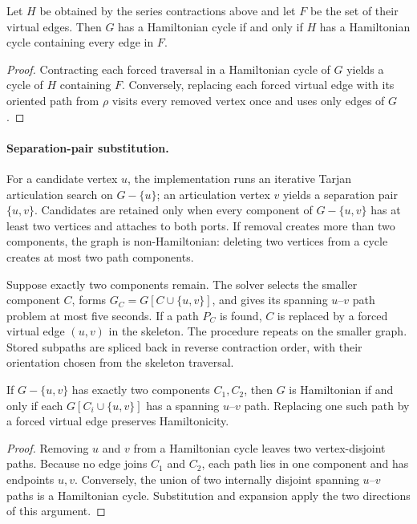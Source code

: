 \documentclass[sigconf,anonymous]{aamas}
\begin{document}
\begin{proposition}
\label{prop:series}
Let $H$ be obtained by the series contractions above and let $F$ be the
set of their virtual edges. Then $G$ has a Hamiltonian cycle if and only
if $H$ has a Hamiltonian cycle containing every edge in $F$.
\end{proposition}
\begin{proof}
Contracting each forced traversal in a Hamiltonian cycle of $G$ yields a
cycle of $H$ containing $F$. Conversely, replacing each forced virtual
edge with its oriented path from $\rho$ visits every removed vertex once
and uses only edges of $G$.
\end{proof}

\paragraph{Separation-pair substitution.}
For a candidate vertex $u$, the implementation runs an iterative Tarjan
articulation search on $G-\{u\}$; an articulation vertex $v$ yields a
separation pair $\{u,v\}$. Candidates are retained only when every
component of $G-\{u,v\}$ has at least two vertices and attaches to both
ports. If removal creates more than two components, the graph is
non-Hamiltonian: deleting two vertices from a cycle creates at most two
path components.

Suppose exactly two components remain. The solver selects the smaller
component $C$, forms $G_C=G[C\cup\{u,v\}]$, and gives its spanning
$u$--$v$ path problem at most five seconds. If a path $P_C$ is found,
$C$ is replaced by a forced virtual edge $(u,v)$ in the skeleton. The
procedure repeats on the smaller graph. Stored subpaths are spliced back
in reverse contraction order, with their orientation chosen from the
skeleton traversal.

\begin{proposition}
\label{prop:twocut}
If $G-\{u,v\}$ has exactly two components $C_1,C_2$, then $G$ is
Hamiltonian if and only if each $G[C_i\cup\{u,v\}]$ has a spanning
$u$--$v$ path. Replacing one such path by a forced virtual edge preserves
Hamiltonicity.
\end{proposition}
\begin{proof}
Removing $u$ and $v$ from a Hamiltonian cycle leaves two vertex-disjoint
paths. Because no edge joins $C_1$ and $C_2$, each path lies in one
component and has endpoints $u,v$. Conversely, the union of two
internally disjoint spanning $u$--$v$ paths is a Hamiltonian cycle.
Substitution and expansion apply the two directions of this argument.
\end{proof}
\end{document}
